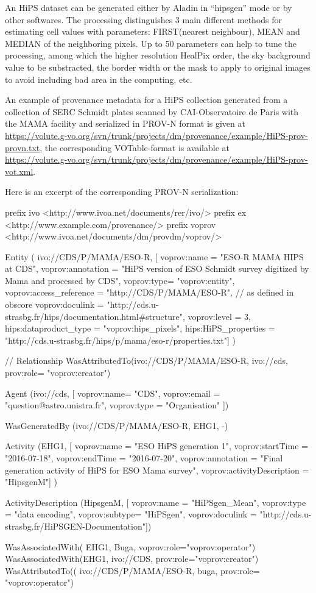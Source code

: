 An HiPS dataset can be generated either by Aladin in ``hipsgen'' mode or by other softwares.
The processing distinguishes 3 main different methods for estimating cell values with parameters: FIRST(nearest neighbour), MEAN and MEDIAN of the neighboring pixels. Up to 50 parameters can help to tune the processing, among which the higher resolution HealPix order, the sky background value to be substracted, the border width or the mask to apply to original images to avoid including bad area in the computing, etc.


An example of provenance metadata for a HiPS collection generated from a collection of SERC Schmidt plates scanned by CAI-Observatoire de Paris with the MAMA facility and serialized in PROV-N format is given at \\\footnotesize
\footnotesize{\url{https://volute.g-vo.org/svn/trunk/projects/dm/provenance/example/HiPS-prov-provn.txt}}, the corresponding VOTable-format is available at \\
\url{https://volute.g-vo.org/svn/trunk/projects/dm/provenance/example/HiPS-prov-vot.xml}.

Here is an excerpt of the corresponding PROV-N serialization:

\begin{verbnobox}[\scriptsize]
prefix ivo <http://www.ivoa.net/documents/rer/ivo/>
prefix ex <http://www.example.com/provenance/>
prefix voprov <http://www.ivoa.net/documents/dm/provdm/voprov/>

Entity
( ivo://CDS/P/MAMA/ESO-R, 
[ voprov:name = "ESO-R MAMA HIPS at CDS",
voprov:annotation = "HiPS version of ESO Schmidt survey digitized by Mama and processed by CDS",
voprov:type= "voprov:entity",
voprov:access_reference = "http://CDS/P/MAMA/ESO-R", // as defined in obscore 
voprov:doculink = "http://cds.u-strasbg.fr/hips/documentation.html#structure",
voprov:level = 3,
hips:dataproduct_type = "voprov:hips_pixels",
hips:HiPS_properties = "http://cds.u-strasbg.fr/hips/p/mama/eso-r/properties.txt"] )

// Relationship
WasAttributedTo(ivo://CDS/P/MAMA/ESO-R, ivo://cds, prov:role= "voprov:creator")

Agent
(ivo://cds,
[ voprov:name= "CDS",
voprov:email = "question@astro.unistra.fr",
voprov:type = "Organisation" ]) 

WasGeneratedBy  (ivo://CDS/P/MAMA/ESO-R, EHG1, -) 

Activity
(EHG1,
[ voprov:name = "ESO HiPS generation 1",
voprov:startTime = "2016-07-18", 
voprov:endTime = "2016-07-20",
voprov:annotation = "Final generation activity of HiPS for ESO Mama survey",
voprov:activityDescription = "HipsgenM"] )
 
ActivityDescription 
(HipsgenM,
[ voprov:name = "HiPSgen_Mean",
voprov:type = "data encoding",
voprov:subtype= "HiPSgen",
voprov:doculink = "http://cds.u-strasbg.fr/HiPSGEN-Documentation"])

WasAssociatedWith( EHG1, Buga, voprov:role="voprov:operator")
WasAssociatedWith(EHG1, ivo://CDS, prov:role="voprov:creator")
WasAttributedTo(( ivo://CDS/P/MAMA/ESO-R, buga, prov:role= "voprov:operator")
\end{verbnobox}
